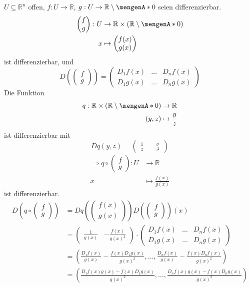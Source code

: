 $U \subseteq \mathbb{R}^n$ offen, $f: U \to \mathbb{R}$, $g: U \to \mathbb{R} \setminus \set{0}$ seien differenzierbar.
\begin{align*}
	\begin{pmatrix}
		f \\ g 
	\end{pmatrix} : U &\to  \mathbb{R} \times ( \mathbb{R} \setminus \set{0})  \\
	x &\mapsto \begin{pmatrix}
		f(x) \\ g(x)
	\end{pmatrix}
\end{align*}
ist differenzierbar, und
\[
	D(\begin{pmatrix}
		f \\ g
	\end{pmatrix}) = \begin{pmatrix}
		D_1f(x) & \dots & D_nf(x) \\
		D_1g(x) & \dots & D_ng(x)
	\end{pmatrix}
\]
Die Funktion 
\begin{align*}
	q: \mathbb{R} \times ( \mathbb{R} \setminus \set{0}) &\to  \mathbb{R} \\
	(y,z) &\mapsto \frac{y}{z} 
\end{align*}
ist differenzierbar mit
\[
	Dq(y,z)= \begin{pmatrix}
		\frac{1}{z} & -\frac{y}{z^2}
	\end{pmatrix}
\]
\begin{align*}
	\Rightarrow q \circ \begin{pmatrix}
		f \\ g
	\end{pmatrix} : U &\to \mathbb{R} \\
	x &\mapsto \frac{f(x)}{g(x)}
\end{align*} ist differenzierbar.
\begin{align*}
	D\left(q \circ \begin{pmatrix}
		f \\ g
	\end{pmatrix}\right)&= Dq\left(\begin{pmatrix}
		f(x) \\ g(x)
	\end{pmatrix}\right) D \left(\begin{pmatrix}
		f \\ g
	\end{pmatrix}\right)(x) \\ &= \begin{pmatrix}
		\frac{1}{g(x)} & -\frac{f(x)}{g(x)^2}
	\end{pmatrix} \cdot \begin{pmatrix}
		D_1f(x) & \dots & D_nf(x) \\
		D_1g(x) & \dots & D_ng(x)
	\end{pmatrix} \\
	&= \left( \frac{D_1f(x)}{g(x)} - \frac{f(x)D_1g(x)}{g(x)^2}, \dots, \frac{D_nf(x)}{g(x)} - \frac{f(x)D_nf(x)}{g(x)^2}  \right)\\
	&= \left( \frac{D_1f(x)g(x)-f(x)D_1g(x)}{g(x)^2}, \dots , \frac{D_nf(x)g(x)-f(x)D_ng(x)}{g(x)^2}  \right)
\end{align*}
